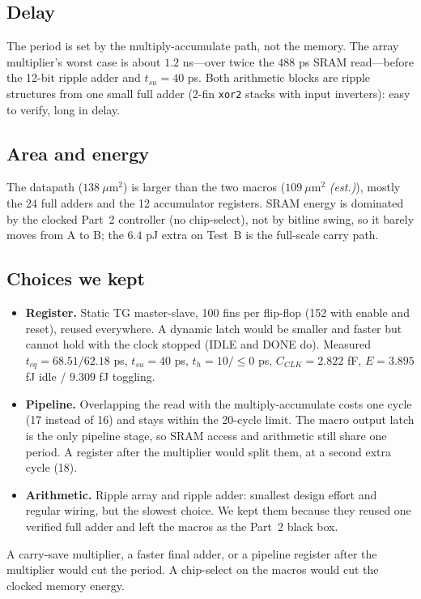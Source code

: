 \documentclass[10pt,letterpaper]{article}
\newcommand{\est}{\textit{(est.)}}
\newcommand{\code}[1]{\texttt{#1}}
\begin{document}
\subsection{Delay}
The period is set by the multiply-accumulate path, not the memory. The array multiplier's worst case is about $1.2$ ns---over twice the $488$ ps SRAM read---before the 12-bit ripple adder and $t_{su}=40$ ps. Both arithmetic blocks are ripple structures from one small full adder (2-fin \code{xor2} stacks with input inverters): easy to verify, long in delay.

\subsection{Area and energy}
The datapath ($138\ \mu$m$^2$) is larger than the two macros ($109\ \mu$m$^2$ \est), mostly the 24 full adders and the 12 accumulator registers. SRAM energy is dominated by the clocked Part~2 controller (no chip-select), not by bitline swing, so it barely moves from A to B; the $6.4$ pJ extra on Test~B is the full-scale carry path.

\subsection{Choices we kept}
\begin{itemize}\setlength{\itemsep}{0.55em}\setlength{\parsep}{0pt}\setlength{\topsep}{0.4em}
\item \textbf{Register.} Static TG master-slave, 100 fins per flip-flop (152 with enable and reset), reused everywhere. A dynamic latch would be smaller and faster but cannot hold with the clock stopped (IDLE and DONE do). Measured $t_{cq}=68.51/62.18$ ps, $t_{su}=40$ ps, $t_{h}=10/\le0$ ps, $C_{CLK}=2.822$ fF, $E=3.895$ fJ idle / $9.309$ fJ toggling.
\item \textbf{Pipeline.} Overlapping the read with the multiply-accumulate costs one cycle (17 instead of 16) and stays within the 20-cycle limit. The macro output latch is the only pipeline stage, so SRAM access and arithmetic still share one period. A register after the multiplier would split them, at a second extra cycle (18).
\item \textbf{Arithmetic.} Ripple array and ripple adder: smallest design effort and regular wiring, but the slowest choice. We kept them because they reused one verified full adder and left the macros as the Part~2 black box.
\end{itemize}

A carry-save multiplier, a faster final adder, or a pipeline register after the multiplier would cut the period. A chip-select on the macros would cut the clocked memory energy.
\end{document}
